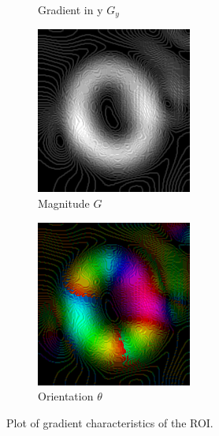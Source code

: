 \begin{figure}[ht]
\begin{subfigure}{.33\textwidth}
          \caption{Gradient in y \textbf{$G_{y}$}}
          \label{fig:sy}
        \end{subfigure}
        \begin{subfigure}{.33\textwidth}
          \centering
          \includegraphics[width=.9\linewidth]{plots/eye_dataset/mag.png}
          \caption{Magnitude \textbf{$G$}}
          \label{fig:mag}
        \end{subfigure}%
        \begin{subfigure}{.33\textwidth}
          \centering
          \includegraphics[width=.9\linewidth]{plots/eye_dataset/direction.png}
          \caption{Orientation \textbf{$\theta$}}
          \label{fig:orientation}
        \end{subfigure}
        \caption{Plot of gradient characteristics of the ROI.}
        \label{fig:gradient}
        \end{figure}
